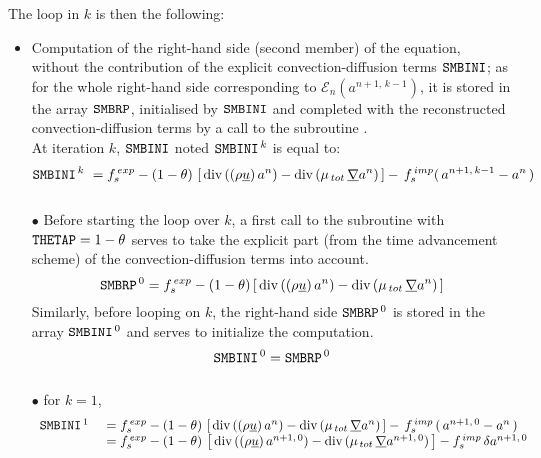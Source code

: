 The loop in $k$ is then the following:
\begin{itemize}
\item Computation of the right-hand side (second member) of the equation, without the contribution of
the explicit convection-diffusion terms $\text{\texttt{SMBINI}}$; as for the whole right-hand side corresponding
to $\mathcal{E}_{n}(a^{n+1,\,k-1})$, it is stored in the array $\text{\texttt{SMBRP}}$,
initialised by $\text{\texttt{SMBINI}}$ and completed with the reconstructed
convection-diffusion terms by a call to the subroutine .\\
At iteration $k$, $\text{\texttt{SMBINI}}$ noted  $\text{\texttt{SMBINI}}^{\,k}$ is equal to:\\
\begin{equation}\notag
\text{\texttt{SMBINI}}^{\,k}\  = f_s^{\,exp}-(1-\theta)\,\left[\,\text{div}\,((\rho \underline{u})\,a^n) - \text{div}\,(\mu_{\,tot}\,\underline{\nabla} a^n)\,\right]-\,f_s^{\,imp}(\,a^{n+1,\,k-1} - a^n\,) \\
\end{equation}
\\
$\bullet$ Before starting the loop over $k$, a first call to the subroutine  with $\text{\texttt{THETAP}}=1-\theta$ serves to take the explicit part (from the time advancement scheme) of the convection-diffusion terms into account.
\begin{equation}\notag
\displaystyle
\text{\texttt{SMBRP}}^{\,0} = f_s^{\,exp} -(1-\theta)\,[\,\text{div}\,((\rho \underline{u})\,a^n) - \text{div}\,(\mu_{\,tot}\,\underline{\nabla} a^n)\,]\\
\end{equation}
Similarly, before looping on $k$, the right-hand side $\text{\texttt{SMBRP}}^{\,0}$ is stored in the array $\text{\texttt{SMBINI}}^{\,0}$ and serves to initialize the computation.
\begin{equation}\notag
\text{\texttt{SMBINI}}^{\,0} =\text{\texttt{SMBRP}}^{\,0}
\end{equation}
\\
$\bullet$ for $k = 1$,
\begin{equation}\notag
\begin{array}{ll}
\text{\texttt{SMBINI}}^{\,1}\ &=f_s^{\,exp}-(1-\theta)\,\left[\,\text{div}\,((\rho \underline{u})\,a^n) - \text{div}\,(\mu_{\,tot}\,\underline{\nabla} a^n)\,\right]-\,f_s^{\,imp}\,(\,a^{n+1,\,0} - a^n\,)\\
&=f_s^{\,exp}- (1-\theta)\,\left[\,\text{div}\,((\rho \underline{u})\,a^{n+1,\,0}) - \text{div}\,(\mu_{\,tot}\,\underline{\nabla} a^{n+1,\,0})\,\right]-f_s^{\,imp}\,\delta a^{n+1,\,0} \\
\end{array}
\end{equation}

\end{itemize}
